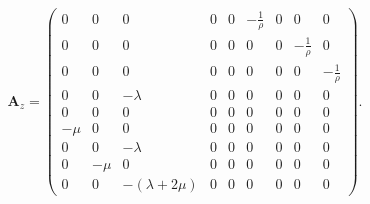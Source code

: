 \begin{displaymath}
\mathbf{A}_z =
\left( \begin{array}{cccccccccccc}
0 & 0 & 0 & 0 & 0 & -\frac 1 \rho & 0 & 0 & 0 \\
0 & 0 & 0 & 0 & 0 & 0 & 0 & -\frac 1 \rho & 0 \\
0 & 0 & 0 & 0 & 0 & 0 & 0 & 0 & -\frac 1 \rho \\
0 & 0 & -\lambda & 0 & 0 & 0 & 0 & 0 & 0 \\
0 & 0 & 0 & 0 & 0 & 0 & 0 & 0 & 0 \\
-\mu & 0 & 0 & 0 & 0 & 0 & 0 & 0 & 0 \\
0 & 0 & -\lambda & 0 & 0 & 0 & 0 & 0 & 0 \\
0 & -\mu & 0 & 0 & 0 & 0 & 0 & 0 & 0 \\
0 & 0 & -(\lambda+2\mu) & 0 & 0 & 0 & 0 & 0 & 0
\end{array} \right).
\end{displaymath}
